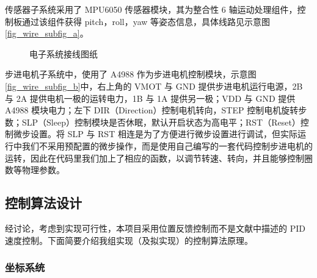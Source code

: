 \documentclass[a4paper]{ctexart}
\numberwithin{equation}{section}
\numberwithin{table}{section}
\numberwithin{figure}{section}
\begin{document}
传感器子系统采用了 MPU6050 传感器模块，其为整合性 6 轴运动处理组件，控制板通过该组件获得 pitch，roll，yaw 等姿态信息，具体线路见示意图\ref{fig_wire_subfig_a}。

\begin{figure}[H]
  \centering
  \hfill
  \caption{电子系统接线图纸}
  \label{fig_wire}
\end{figure}


步进电机子系统中，使用了 A4988 作为步进电机控制模块，示意图\ref{fig_wire_subfig_b}中，右上角的 VMOT 与 GND 提供步进电机运行电源，2B 与 2A 提供电机一极的运转电力，1B 与 1A 提供另一极；VDD 与 GND 提供 A4988 模块电力；左下 DIR（Direction）控制电机转向，STEP 控制电机旋转步数；SLP（Sleep）控制模块是否休眠，默认开启状态为高电平；RST（Reset）控制微步设置。将 SLP 与 RST 相连是为了方便进行微步设置进行调试，但实际运行中我们不采用预配置的微步操作，而是使用自己编写的一套代码控制步进电机的运转，因此在代码里我们加上了相应的函数，以调节转速、转向，并且能够控制圈数等物理参数。

\subsection{控制算法设计}

经讨论，考虑到实现可行性，本项目采用位置反馈控制而不是文献中描述的 PID 速度控制。下面简要介绍我组实现（及拟实现）的控制算法原理。

\subsubsection{坐标系统}
\end{document}
